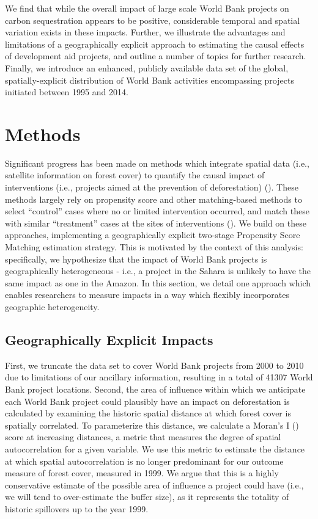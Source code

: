 \documentclass{article}\usepackage[]{graphicx}\usepackage[]{color}
\newenvironment{knitrout}{}{}  %
\begin{document}
\begin{knitrout}
We find that while the overall impact of large scale World Bank projects on carbon sequestration appears to be positive, considerable temporal and spatial variation exists in these impacts.
Further, we illustrate the advantages and limitations of a geographically explicit approach to estimating the causal effects of development aid projects, and outline a number of topics for further research.
Finally, we introduce an enhanced, publicly available data set of the global, spatially-explicit distribution of World Bank activities encompassing projects initiated between 1995 and 2014.

\newpage
\section{Methods}

Significant progress has been made on methods which integrate spatial data (i.e., satellite information on forest cover) to quantify the causal impact of interventions (i.e., projects aimed at the prevention of deforestation) (\cite{nelson_effectiveness_2011}).  
These methods largely rely on propensity score and other matching-based methods to select ``control'' cases where no or limited intervention occurred, and match these with similar ``treatment'' cases at the sites of interventions (\cite{andam_measuring_2008}). 
We build on these approaches, implementing a geographically explicit two-stage Propensity Score Matching estimation strategy.
This is motivated by the context of this analysis: specifically, we hypothesize that the impact of World Bank projects is geographically heterogeneous - i.e., a project in the Sahara is unlikely to have the same impact as one in the Amazon.
In this section, we detail one approach which enables researchers to measure impacts in a way which flexibly incorporates geographic heterogeneity.


\subsection{Geographically Explicit Impacts}

First, we truncate the data set to cover World Bank projects from 2000 to 2010 due to limitations of our ancillary information, resulting in a total of 41307 World Bank project locations.
Second, the area of influence within which we anticipate each World Bank project could plausibly have an impact on deforestation is calculated by examining the historic spatial distance at which forest cover is spatially correlated. 
To parameterize this distance, we calculate a Moran's I (\cite{getis_analysis_1992}) score at increasing distances, a metric that measures the degree of spatial autocorrelation for a given variable.
We use this metric to estimate the distance at which spatial autocorrelation is no longer predominant for our outcome measure of forest cover, measured in 1999.  
We argue that this is a highly conservative estimate of the possible area of influence a project could have (i.e., we will tend to over-estimate the buffer size), as it represents the totality of historic spillovers up to the year 1999.


\end{knitrout}
\end{document}
